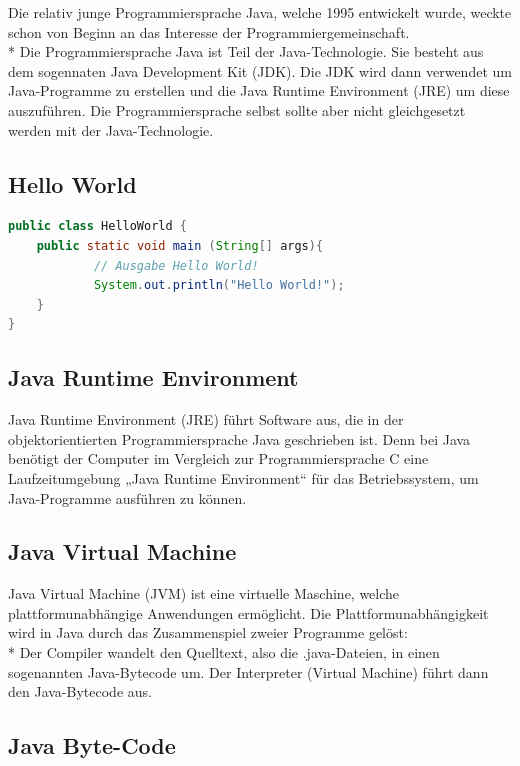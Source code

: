 Die relativ junge Programmiersprache Java, welche 1995 entwickelt wurde, weckte schon von Beginn an das Interesse der Programmiergemeinschaft. \cite{Java} \\*
Die Programmiersprache Java ist Teil der Java-Technologie. 
Sie besteht aus dem sogennaten Java Development Kit (JDK). Die JDK wird dann verwendet um Java-Programme zu erstellen und die Java Runtime Environment (JRE) um diese
auszuführen.    
Die Programmiersprache selbst sollte aber nicht gleichgesetzt werden mit der Java-Technologie. \cite{JavaSprache}

\subsection{Hello World}
\author{David Ignjatovic} 
\begin{lstlisting}[language=Java,caption=Java File HelloWorld,label=lst:impl:foo]
public class HelloWorld {
    public static void main (String[] args){
            // Ausgabe Hello World!
            System.out.println("Hello World!");
    }
}
\end{lstlisting}

\subsection{Java Runtime Environment }
\author{David Ignjatovic} 

Java Runtime Environment (JRE) führt Software aus, die in der objektorientierten Programmiersprache Java geschrieben ist. 
Denn bei Java benötigt der Computer im Vergleich zur Programmiersprache C eine Laufzeitumgebung „Java Runtime Environment“ für das Betriebssystem, um Java-Programme ausführen zu können. \cite{JRE}

\subsection{Java Virtual Machine}
\author{David Ignjatovic} 

Java Virtual Machine (JVM) ist eine virtuelle Maschine, welche plattformunabhängige Anwendungen ermöglicht.
Die Plattformunabhängigkeit wird in Java durch das Zusammenspiel zweier Programme gelöst: \\*
Der Compiler wandelt den Quelltext, also die .java-Dateien, in einen sogenannten Java-Bytecode um. Der Interpreter (Virtual Machine) führt dann den Java-Bytecode aus. \cite{JVM}

\subsection{Java Byte-Code}
\author{David Ignjatovic} 


